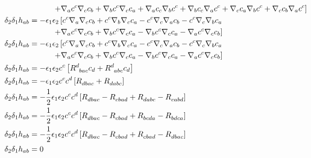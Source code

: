 \begin{align*}
    &\quad\quad\quad\left.+\nabla_{a}c^c\nabla_cc_{b}+\nabla_{b}c^c\nabla_cc_{a}+\nabla_{a}c_{c}\nabla_bc^c+\nabla_{b}c_{c}\nabla_ac^c+\nabla_{c}c_{a}\nabla_bc^c+\nabla_{c}c_{b}\nabla_ac^c\right]\\
    \delta_2\delta_1 h_{ab}&=-\epsilon_1\epsilon_2\left[c^c\nabla_{a}\nabla_cc_{b}+c^c\nabla_{b}\nabla_cc_{a}-c^c\nabla_c\nabla_{a}c_{b}-c^c\nabla_c\nabla_{b}c_{a}\right.\\
    &\quad\quad\quad\left.+\nabla_{a}c^c\nabla_cc_{b}+\nabla_{b}c^c\nabla_cc_{a}-\nabla_bc^c\nabla_{c}c_{a}-\nabla_ac^c\nabla_{c}c_{b}\right]\\
    \delta_2\delta_1 h_{ab}&=-\epsilon_1\epsilon_2\left[c^c\nabla_{a}\nabla_cc_{b}+c^c\nabla_{b}\nabla_cc_{a}-c^c\nabla_c\nabla_{a}c_{b}-c^c\nabla_c\nabla_{b}c_{a}\right.\\
    &\quad\quad\quad\left.+\nabla_{a}c^c\nabla_cc_{b}+\nabla_{b}c^c\nabla_cc_{a}-\nabla_bc^c\nabla_{c}c_{a}-\nabla_ac^c\nabla_{c}c_{b}\right]\\
    \delta_2\delta_1 h_{ab}&=-\epsilon_1\epsilon_2c^c\left[\tensor{R}{^d_b_a_c}c_{d}+\tensor{R}{^d_a_b_c}c_{d}\right]\\
    \delta_2\delta_1 h_{ab}&=-\epsilon_1\epsilon_2c^cc^d\left[\tensor{R}{_d_b_a_c}+\tensor{R}{_d_a_b_c}\right]\\
    \delta_2\delta_1 h_{ab}&=-\frac12\epsilon_1\epsilon_2c^cc^d\left[\tensor{R}{_d_b_a_c}-\tensor{R}{_c_b_a_d}+\tensor{R}{_d_a_b_c}-\tensor{R}{_c_a_b_d}\right]\\
    \delta_2\delta_1 h_{ab}&=-\frac12\epsilon_1\epsilon_2c^cc^d\left[\tensor{R}{_d_b_a_c}-\tensor{R}{_c_b_a_d}+\tensor{R}{_b_c_d_a}-\tensor{R}{_b_d_c_a}\right]\\
    \delta_2\delta_1 h_{ab}&=-\frac12\epsilon_1\epsilon_2c^cc^d\left[\tensor{R}{_d_b_a_c}-\tensor{R}{_c_b_a_d}+\tensor{R}{_c_b_a_d}-\tensor{R}{_d_b_a_c}\right]\\
    \delta_2\delta_1 h_{ab}&=0
\end{align*}

